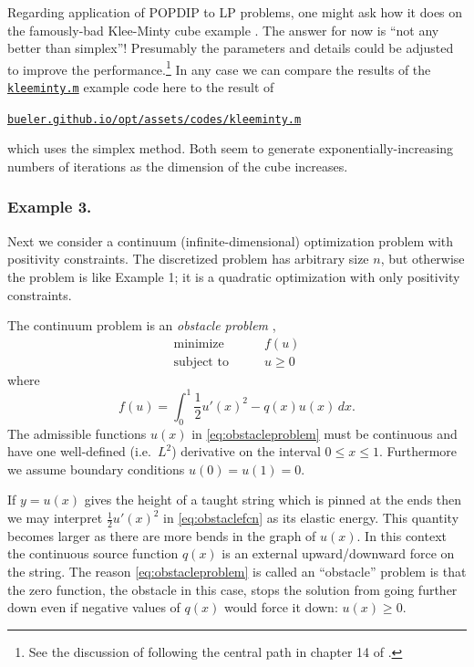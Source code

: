 \documentclass[11pt]{article}
\begin{document}
Regarding application of POPDIP to LP problems, one might ask how it does on the famously-bad Klee-Minty cube example \cite[chapter 9]{GrivaNashSofer2009}.  The answer for now is ``not any better than simplex''!   Presumably the parameters and details could be adjusted to improve the performance.\footnote{See the discussion of following the central path in chapter 14 of \cite{NocedalWright2006}.}  In any case we can compare the results of the \href{https://github.com/bueler/popdip/blob/main/matlab/kleeminty.m}{\texttt{kleeminty.m}} example code here to the result of

\medskip
\centerline{\href{https://bueler.github.io/opt/assets/codes/kleeminty.m}{\texttt{bueler.github.io/opt/assets/codes/kleeminty.m}}}

\medskip
\noindent which uses the simplex method.  Both seem to generate exponentially-increasing numbers of iterations as the dimension of the cube increases.


\subsubsection*{Example 3.}

Next we consider a continuum (infinite-dimensional) optimization problem with positivity constraints.  The discretized problem has arbitrary size $n$, but otherwise the problem is like Example 1; it is a quadratic optimization with only positivity constraints.

The continuum problem is an \emph{obstacle problem} \cite[chapter 12]{Bueler2021},
\begin{equation}
\begin{matrix}
\text{minimize} \qquad & f(u) \\
\text{subject to} \qquad & u \ge 0
\end{matrix} \label{eq:obstacleproblem}
\end{equation}
where
\begin{equation}
    f(u) = \int_0^1 \frac{1}{2} u'(x)^2 - q(x) u(x)\,dx. \label{eq:obstaclefcn}
\end{equation}
The admissible functions $u(x)$ in \eqref{eq:obstacleproblem} must be continuous and have one well-defined (i.e.~$L^2$) derivative on the interval $0\le x \le 1$.  Furthermore we assume boundary conditions $u(0)=u(1)=0$.

If $y=u(x)$ gives the height of a taught string which is pinned at the ends then we may interpret $\frac{1}{2} u'(x)^2$ in \eqref{eq:obstaclefcn} as its elastic energy.  This quantity becomes larger as there are more bends in the graph of $u(x)$.  In this context the continuous source function $q(x)$ is an external upward/downward force on the string.  The reason \eqref{eq:obstacleproblem} is called an ``obstacle'' problem \cite{KinderlehrerStampacchia1980} is that the zero function, the obstacle in this case, stops the solution from going further down even if negative values of $q(x)$ would force it down: $u(x)\ge 0$.
\end{document}
